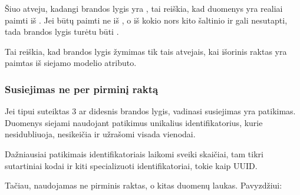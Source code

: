 \documentclass[letterpaper,10pt,lithuanian]{sphinxmanual}
\begin{document}
\sphinxAtStartPar
Šiuo atveju, kadangi  brandos lygis yra , tai reiškia, kad
 duomenys yra realiai paimti iš . Jei
 būtų paimti ne iš , o iš kokio nors kito
šaltinio ir gali nesutapti, tada brandos lygis turėtu būti .

\sphinxAtStartPar
Tai reiškia, kad  brandos lygis žymimas tik tais atvejais, kai išorinis
raktas yra paimtas iš siejamo modelio atributo.


\subsubsection{Susiejimas ne per pirminį raktą}
\label{\detokenize{identifikatoriai:susiejimas-ne-per-pirmini-rakta}}
\sphinxAtStartPar
Jei  tipui suteiktas 3 ar didesnis brandos lygis, vadinasi susiejimas yra
patikimas. Duomenys siejami naudojant patikimus unikalius identifikatorius,
kurie nesidubliuoja, nesikeičia ir užrašomi visada vienodai.

\sphinxAtStartPar
Dažniausiai patikimais identifikatoriais laikomi sveiki skaičiai, tam tikri
sutartiniai kodai ir kiti specializuoti identifikatoriai, tokie kaip UUID.

\sphinxAtStartPar
Tačiau, naudojamas ne pirminis raktas, o kitas duomenų laukas. Pavyzdžiui:
\end{document}
